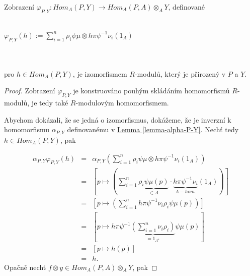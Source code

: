        \begin{thm}\label{varphi-izomorfismus}
         Zobrazení $\varphi_{P,Y}:Hom_A(P,Y)\rightarrow Hom_A(P,A)\otimes_A Y$, 
         definované \\\\
         \centerline{$\varphi_{P,Y}(h):=\sum_{i=1}^n\rho_i\psi\mu\otimes h\pi\psi^{-1}\nu_i(1_A)$} 
         \\\\
         pro $h\in Hom_A(P,Y)$, je izomorfismem $R$-modulů, který je přirozený v 
         $P$ a $Y$.
       \end{thm}
       \begin{proof}
         Zobrazení $\varphi_{P,Y}$ je konstruováno pouhým skládáním homomorfismů 
         $R$-modulů, je tedy také $R$-modulovým homomorfismem.
         
         Abychom dokázali, že se jedná o izomorfismus, dokážeme, že je inverzní k 
         homomorfismu $\alpha_{P,Y}$ definovanému v \hyperref[lemma-alpha-P-Y]{Lemma 
         \ref*{lemma-alpha-P-Y}}. Nechť tedy $h\in Hom_A(P,Y)$, pak
         
         \begin{eqnarray}
           \alpha_{P,Y} \varphi_{P,Y}(h) &=& \alpha_{P,Y} \left(  \sum_{i=1}^n\rho_i\psi\mu\otimes h\pi\psi^{-1}\nu_i(1_A) \right) \nonumber \\
           &=& 
             \left[ 
               p \mapsto \left( 
                 \sum_{i=1}^n
                 \underbrace{ \rho_i\psi\mu(p) }_{\in A} 
                 \cdot 
                 \underbrace{ h\pi\psi^{-1}\nu_i }_{A-hom.}
                 (1_A) 
               \right) \right] \nonumber \\
           &=& \left[ p \mapsto \left( \sum_{i=1}^n h\pi\psi^{-1}\nu_i\rho_i\psi\mu(p) \right) \right] \nonumber \\
           &=& 
             \left[ 
               p \mapsto h\pi\psi^{-1} 
               \underbrace{ \left( \sum_{i=1}^n \nu_i\rho_i \right) }_{=1_{A^n}}
               \psi\mu(p) 
             \right]\nonumber \\
           &=& [p\mapsto h(p)] \nonumber \\
           &=& h. \nonumber
         \end{eqnarray}         
         Opačně nechť $f\otimes y\in Hom_A(P,A)\otimes_A Y$, pak
         

\end{proof}
